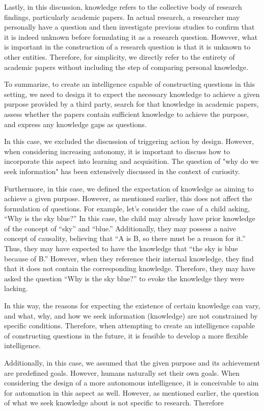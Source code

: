 \documentclass{book}
\begin{document}
Lastly, in this discussion, knowledge refers to the collective body of research findings, particularly academic papers. In actual research, a researcher may personally have a question and then investigate previous studies to confirm that it is indeed unknown before formulating it as a research question. However, what is important in the construction of a research question is that it is unknown to other entities. Therefore, for simplicity, we directly refer to the entirety of academic papers without including the step of comparing personal knowledge.

To summarize, to create an intelligence capable of constructing questions in this setting, we need to design it to expect the necessary knowledge to achieve a given purpose provided by a third party, search for that knowledge in academic papers, assess whether the papers contain sufficient knowledge to achieve the purpose, and express any knowledge gaps as questions.

In this case, we excluded the discussion of triggering action by design. However, when considering increasing autonomy, it is important to discuss how to incorporate this aspect into learning and acquisition. The question of "why do we seek information" has been extensively discussed in the context of curiosity.

Furthermore, in this case, we defined the expectation of knowledge as aiming to achieve a given purpose. However, as mentioned earlier, this does not affect the formulation of questions. For example, let's consider the case of a child asking, ``Why is the sky blue?'' In this case, the child may already have prior knowledge of the concept of ``sky'' and ``blue.'' Additionally, they may possess a naive concept of causality, believing that ``A is B, so there must be a reason for it.'' Thus, they may have expected to have the knowledge that ``the sky is blue because of B.'' However, when they reference their internal knowledge, they find that it does not contain the corresponding knowledge. Therefore, they may have asked the question ``Why is the sky blue?'' to evoke the knowledge they were lacking.

In this way, the reasons for expecting the existence of certain knowledge can vary, and what, why, and how we seek information (knowledge) are not constrained by specific conditions. Therefore, when attempting to create an intelligence capable of constructing questions in the future, it is feasible to develop a more flexible intelligence.

Additionally, in this case, we assumed that the given purpose and its achievement are predefined goals. However, humans naturally set their own goals. When considering the design of a more autonomous intelligence, it is conceivable to aim for automation in this aspect as well. However, as mentioned earlier, the question of what we seek knowledge about is not specific to research. Therefore
\end{document}
